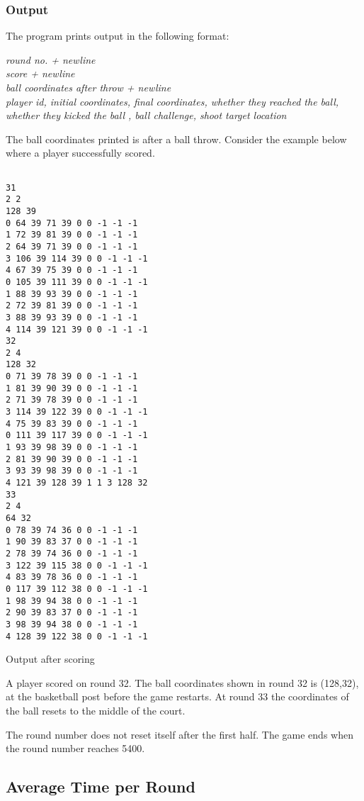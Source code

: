 \documentclass{article}
\begin{document}
\subsubsection{Output}

The program prints output in the following format:


\noindent
\textit{round no. + newline \\
score + newline \\
ball coordinates after throw + newline \\
player id, initial coordinates, final
coordinates, whether they reached the ball, whether they kicked the ball , ball challenge, shoot
target location}


The ball coordinates printed is after a ball throw. Consider the example below where a player successfully scored.

\begin{program}[H]
\begin{verbatim}

31
2 2
128 39
0 64 39 71 39 0 0 -1 -1 -1
1 72 39 81 39 0 0 -1 -1 -1
2 64 39 71 39 0 0 -1 -1 -1
3 106 39 114 39 0 0 -1 -1 -1
4 67 39 75 39 0 0 -1 -1 -1
0 105 39 111 39 0 0 -1 -1 -1
1 88 39 93 39 0 0 -1 -1 -1
2 72 39 81 39 0 0 -1 -1 -1
3 88 39 93 39 0 0 -1 -1 -1
4 114 39 121 39 0 0 -1 -1 -1
32
2 4
128 32
0 71 39 78 39 0 0 -1 -1 -1
1 81 39 90 39 0 0 -1 -1 -1
2 71 39 78 39 0 0 -1 -1 -1
3 114 39 122 39 0 0 -1 -1 -1
4 75 39 83 39 0 0 -1 -1 -1
0 111 39 117 39 0 0 -1 -1 -1
1 93 39 98 39 0 0 -1 -1 -1
2 81 39 90 39 0 0 -1 -1 -1
3 93 39 98 39 0 0 -1 -1 -1
4 121 39 128 39 1 1 3 128 32
33
2 4
64 32
0 78 39 74 36 0 0 -1 -1 -1
1 90 39 83 37 0 0 -1 -1 -1
2 78 39 74 36 0 0 -1 -1 -1
3 122 39 115 38 0 0 -1 -1 -1
4 83 39 78 36 0 0 -1 -1 -1
0 117 39 112 38 0 0 -1 -1 -1
1 98 39 94 38 0 0 -1 -1 -1
2 90 39 83 37 0 0 -1 -1 -1
3 98 39 94 38 0 0 -1 -1 -1
4 128 39 122 38 0 0 -1 -1 -1
\end{verbatim}
  \caption{Output after scoring}
\end{program}

A player scored on round 32. The ball coordinates shown in round 32 is (128,32), at the basketball post before the game restarts. At round 33 the coordinates of the ball resets to the middle of the court.

The round number does not reset itself after the first half. The game ends when the round number reaches 5400.
\subsection{Average Time per Round}
\end{document}
